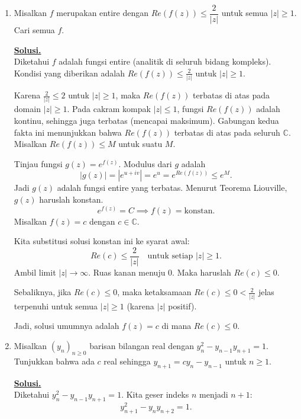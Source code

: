 \documentclass[12pt,twoside]{article}
\newenvironment{solution}
{
	\par\noindent\textbf{\underline{Solusi.}}\\
}
{
	\par
}
\begin{document}
\begin{enumerate}
\begin{solution}
          Jadi, operasi penjumlahan bersifat komutatif.
          Karena semua aksioma gelanggang terpenuhi, maka $(R,+,\times)$ adalah gelanggang.
        \end{solution}

  \item Misalkan $f$ merupakan entire dengan $Re(f(z))\leq \dfrac{2}{|z|}$ untuk semua $|z|\geq 1$. Cari semua $f$.
        \begin{solution}
          Diketahui $f$ adalah fungsi entire (analitik di seluruh bidang kompleks).
          Kondisi yang diberikan adalah $Re(f(z)) \le \frac{2}{|z|}$ untuk $|z| \ge 1$.

          Karena $\frac{2}{|z|} \le 2$ untuk $|z| \ge 1$, maka $Re(f(z))$ terbatas di atas pada domain $|z| \ge 1$.
          Pada cakram kompak $|z| \le 1$, fungsi $Re(f(z))$ adalah kontinu, sehingga juga terbatas (mencapai maksimum).
          Gabungan kedua fakta ini menunjukkan bahwa $Re(f(z))$ terbatas di atas pada seluruh $\mathbb{C}$. Misalkan $Re(f(z)) \le M$ untuk suatu $M$.

          Tinjau fungsi $g(z) = e^{f(z)}$. Modulus dari $g$ adalah
          \[ |g(z)| = |e^{u+iv}| = e^u = e^{Re(f(z))} \le e^M. \]
          Jadi $g(z)$ adalah fungsi entire yang terbatas.
          Menurut Teorema Liouville, $g(z)$ haruslah konstan.
          \[ e^{f(z)} = C \implies f(z) = \text{konstan}. \]
          Misalkan $f(z) = c$ dengan $c \in \mathbb{C}$.

          Kita substitusi solusi konstan ini ke syarat awal:
          \[ Re(c) \le \frac{2}{|z|} \quad \text{untuk setiap } |z| \ge 1. \]
          Ambil limit $|z| \to \infty$. Ruas kanan menuju 0.
          Maka haruslah $Re(c) \le 0$.

          Sebaliknya, jika $Re(c) \le 0$, maka ketaksamaan $Re(c) \le 0 < \frac{2}{|z|}$ jelas terpenuhi untuk semua $|z| \ge 1$ (karena $|z|$ positif).

          Jadi, solusi umumnya adalah $f(z) = c$ di mana $Re(c) \le 0$.
        \end{solution}

  \item Misalkan $(y_n)_{n\geq 0}$ barisan bilangan real dengan $y_n^2-y_{n-1}y_{n+1}=1$. Tunjukkan bahwa ada $c$ real sehingga $y_{n+1}=cy_n-y_{n-1}$ untuk $n\geq 1$.
        \begin{solution}
          Diketahui $y_n^2 - y_{n-1}y_{n+1} = 1$.
          Kita geser indeks $n$ menjadi $n+1$:
          \[ y_{n+1}^2 - y_n y_{n+2} = 1. \]


\end{solution}
\end{enumerate}
\end{document}
